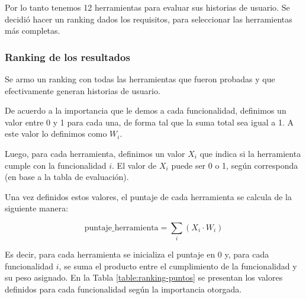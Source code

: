 Por lo tanto tenemos 12 herramientas para evaluar sus historias de usuario. Se decidió hacer un ranking dados los requisitos, para seleccionar las herramientas más completas.

\subsubsection{Ranking de los resultados}

Se armo un ranking con todas las herramientas que fueron probadas y que
efectivamente generan historias de usuario.

De acuerdo a la importancia que le demos a cada funcionalidad, definimos un valor
entre 0 y 1 para cada una, de forma tal que la suma total sea igual a 1.  
A este valor lo definimos como $W_i$.

Luego, para cada herramienta, definimos un valor $X_i$ que indica si la herramienta
cumple con la funcionalidad $i$.  
El valor de $X_i$ puede ser 0 o 1, según corresponda (en base a la tabla de evaluación).

Una vez definidos estos valores, el puntaje de cada herramienta se calcula de la siguiente manera:

\[
\text{puntaje\_herramienta} = \sum_{i} (X_i \cdot W_i)
\]

Es decir, para cada herramienta se inicializa el puntaje en 0 y, para cada funcionalidad $i$,
se suma el producto entre el cumplimiento de la funcionalidad y su peso asignado.
En la Tabla \ref{table:ranking-puntos} se presentan los valores definidos para cada funcionalidad según la importancia otorgada.

